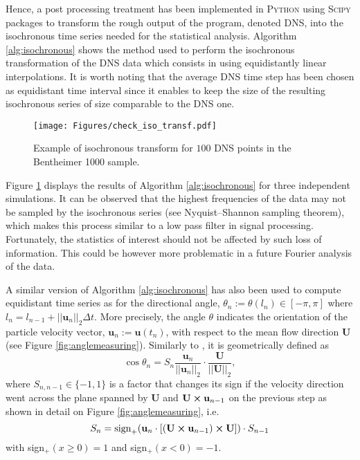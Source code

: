 Hence, a post processing treatment has been implemented in \textsc{Python} using \textsc{Scipy} packages to transform the rough output of the program, denoted DNS, into the isochronous time series needed for the statistical analysis.
Algorithm \ref{alg:isochronous} shows the method used to perform the isochronous transformation of the DNS data which consists in using equidistantly linear interpolations.
It is worth noting that the average DNS time step has been chosen as equidistant time interval since it enables to keep the size of the resulting isochronous series of size comparable to the DNS one.\\
\begin{figure}
	\centering
	\texttt{[image: Figures/check\_iso\_transf.pdf]}
	\caption{Example of isochronous transform for $100$ DNS points in the Bentheimer 1000 sample.}
	\label{fig:checkisotransf}
\end{figure}
Figure \ref{fig:checkisotransf} displays the results of Algorithm \ref{alg:isochronous} for three independent simulations.
It can be observed that the highest frequencies of the data may not be sampled by the isochronous series (see Nyquist–Shannon sampling theorem), which makes this process similar to a low pass filter in signal processing.
Fortunately, the statistics of interest should not be affected by such loss of information. 
This could be however more problematic in a future Fourier analysis of the data.

A similar version of Algorithm \ref{alg:isochronous} has also been used to compute equidistant time series as for the directional angle, $\theta_n:=\theta(l_n)\in[-\pi,\pi]$ where $l_n = l_{n-1} + ||\textbf{u}_n||_2 \Delta t$.
More precisely, the angle $\theta$ indicates the orientation of the particle velocity vector, $\textbf{u}_n :=\textbf{u}(t_n)$, with respect to the mean flow direction $\textbf{U}$ (see Figure \ref{fig:anglemeasuring}). 
Similarly to \citet{Meyer2016}, it is geometrically defined as
\begin{equation}
\cos \theta_n = S_{n} \frac{\textbf{u}_n}{||\textbf{u}_n||_2 }\cdot \frac{\textbf{U}}{||\textbf{U}||_2},
\end{equation}
where $S_{n,n-1}\in\{-1,1\}$ is a factor that changes its sign if the velocity direction went across the plane spanned by $\textbf{U}$ and $\textbf{U}\cross\textbf{u}_{n-1}$ on the previous step as shown in detail on Figure \ref{fig:anglemeasuring}, i.e.
\begin{equation}\label{eq:theta_sign}
S_{n} = \mathrm{sign}_+(\textbf{u}_n\cdot [(\textbf{U}\cross\textbf{u}_{n-1})\cross \textbf{U}])\cdot S_{n-1} 
\end{equation}
with sign$_+(x\geq 0)=1$ and sign$_+(x< 0)=-1$.

